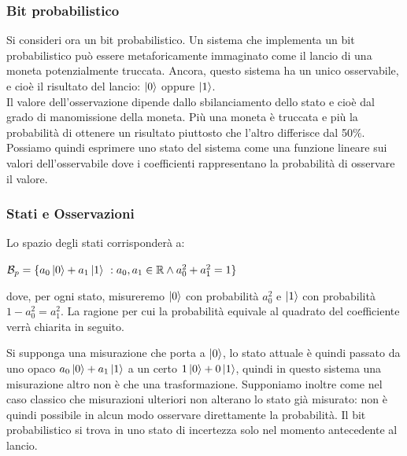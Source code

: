 \documentclass[12pt,a4paper,openright]{report}
\begin{document}
\subsubsection{Bit probabilistico}
Si consideri ora un bit probabilistico. Un sistema che implementa un bit probabilistico può essere metaforicamente immaginato come il lancio
di una moneta potenzialmente truccata. Ancora, questo sistema ha un unico osservabile, e cioè il risultato del lancio: $\ket{0}$ oppure $\ket1$.\\
Il valore dell'osservazione dipende dallo sbilanciamento dello stato e cioè dal grado di manomissione della moneta. Più una moneta è truccata e più la probabilità
di ottenere un risultato piuttosto che l'altro differisce dal 50$\%$. Possiamo quindi esprimere uno stato del sistema come una funzione lineare sui valori dell'osservabile
dove i coefficienti rappresentano la probabilità di osservare il valore. \newpage
\subsubsection{Stati e Osservazioni} 
Lo spazio degli stati corrisponderà a:

\begin{center}
    $ \mathcal{B}_p = \{a_0\ket0 + a_1\ket1 \ : a_0,a_1 \in{\mathbb{R}} \land a_0^2+a_1^2 = 1\}$
\end{center}

\noindent dove, per ogni stato, misureremo $\ket0$ con probabilità $a_0^2$ e $\ket1$ con probabilità $1 - a_0^2 = a_1^2$.
La ragione per cui la probabilità equivale al quadrato del coefficiente verrà chiarita in seguito.\par
Si supponga una misurazione che porta a $\ket0$, lo stato attuale è quindi passato da uno opaco $a_0\ket0 + a_1\ket1$ a un certo $1\ket0+0\ket1$,
quindi in questo sistema una misurazione altro non è che una trasformazione. Supponiamo inoltre come nel caso classico che misurazioni ulteriori non alterano lo stato già
misurato: non è quindi possibile in alcun modo osservare direttamente la probabilità. Il bit probabilistico si trova
in uno stato di incertezza solo nel momento antecedente al lancio.
\end{document}
